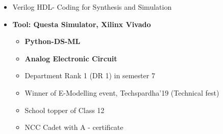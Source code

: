 \documentclass[10pt,a4paper,ragged2e]{altacv}
\begin{document}
\divider
{}
\begin{itemize}
\item Verilog HDL- Coding for Synthesis and Simulation
\item\bf{Tool}{: Questa Simulator, Xilinx Vivado}


\begin{itemize}
    \item\bf{Python-DS-ML}
    \item\bf{Analog Electronic Circuit}
\end{itemize}

\begin{itemize}

\item Department Rank 1 (DR 1) in semester 7
\item Winner of E-Modelling event, Techspardha’19 (Technical fest)

\item School topper of Class 12

\item NCC Cadet with A - certificate
\end{itemize}




\end{itemize}
\end{document}
